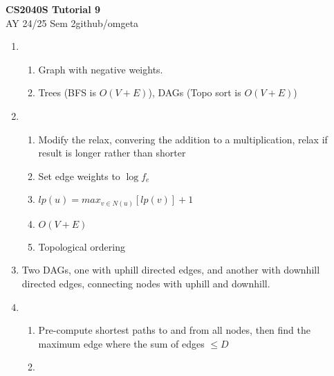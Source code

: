 \documentclass[12pt, a4paper]{article}
\newcommand{\mytitle}{CS2040S Tutorial 9}
\newcommand{\myauthor}{github/omgeta}
\newcommand{\mydate}{AY 24/25 Sem 2}
\begin{document}
\raggedright
\footnotesize
\begin{center}
{\normalsize{\textbf{\mytitle}}} \\
{\footnotesize{\mydate\hspace{2pt}\textemdash\hspace{2pt}\myauthor}}
\end{center}
\begin{enumerate}[Q\arabic*.]
  \item 
    \begin{enumerate}[(\alph*.)]
      \item Graph with negative weights.

      \item Trees (BFS is $O(V+E)$), DAGs (Topo sort is $O(V+E)$) 
    \end{enumerate}

  \item 
    \begin{enumerate}[(\alph*.)]
      \item Modify the relax, convering the addition to a multiplication, relax if result is longer rather than shorter

      \item Set edge weights to $\log f_e$

      \item $lp(u) = max_{v\in N(u)}[lp(v)]+1$ 

      \item $O(V+E)$

      \item Topological ordering
    \end{enumerate}

  \item Two DAGs, one with uphill directed edges, and another with downhill directed edges, connecting nodes with uphill and downhill.

  \item 
    \begin{enumerate}[(\alph*.)]
      \item Pre-compute shortest paths to and from all nodes, then find the maximum edge where the sum of edges $\leq D$

      \item
    \end{enumerate}
\end{enumerate}
\end{document}
